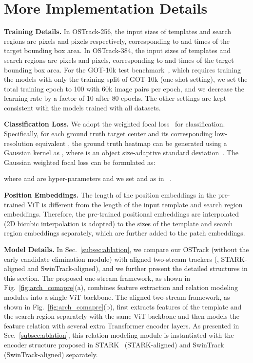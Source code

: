 \section{More Implementation Details}
\label{sec:more_imple}
\textbf{Training Details.}
In OSTrack-256, the input sizes of templates and search regions are  pixels and  pixels respectively, corresponding to  and  times of the target bounding box area. In OSTrack-384, the input sizes of templates and search regions are  pixels and  pixels, corresponding to  and  times of the target bounding box area.
For the GOT-10k test benchmark~\cite{got10k}, which requires training the models with only the training split of GOT-10k  (one-shot setting), we set the total training epoch to 100 with 60k image pairs per epoch, and we decrease the learning rate by a factor of 10 after 80 epochs. The other settings are kept consistent with the models trained with all datasets.

\textbf{Classification Loss.} 
We adopt the weighted focal loss~\cite{cornernet} for classification. Specifically, for each ground truth target center   and its corresponding low-resolution equivalent  , the ground truth heatmap can be generated using a Gaussian kernel as , where  is an object size-adaptive standard deviation~\cite{cornernet}. The Gaussian weighted focal loss can be formulated as:

where  and  are hyper-parameters and we set  and  as in ~\cite{cornernet, centernet}.

\textbf{Position Embeddings.}
The length of the position embeddings in the pre-trained ViT is different from the length of the input template and search region embeddings. Therefore, the pre-trained positional embeddings are interpolated (2D bicubic interpolation is adopted) to the sizes of the template and search region embeddings separately, which are further added to the patch embeddings.

\textbf{Model Details.}
In Sec.~\ref{subsec:ablation}, we compare our OSTrack (without the early candidate elimination module) with aligned two-stream trackers (\ie, STARK-aligned and SwinTrack-aligned), and we further present the detailed structures in this section. The proposed one-stream framework, as shown in Fig.~\ref{fig:arch_comapre}(a), combines feature extraction and relation modeling modules into a single ViT backbone. The aligned two-stream framework,  as shown in Fig.~\ref{fig:arch_comapre}(b), first extracts features of the template and the search region separately with the same ViT backbone and then models the feature relation with several extra Transformer encoder layers. As presented in Sec.~\ref{subsec:ablation}, this relation modeling module is instantiated with the encoder structure proposed in STARK~\cite{stark} (STARK-aligned) and SwinTrack~\cite{swintrack} (SwinTrack-aligned) separately.

